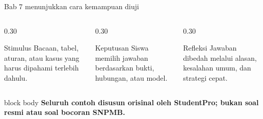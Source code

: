 \begin{frame}{Bab 7 menunjukkan cara kemampuan diuji}
  \begin{columns}[T,onlytextwidth]
    \begin{column}{0.30\textwidth}
      \begin{block}{Stimulus}
        Bacaan, tabel, aturan, atau kasus yang harus dipahami terlebih dahulu.
      \end{block}
    \end{column}
    \begin{column}{0.30\textwidth}
      \begin{block}{Keputusan}
        Siswa memilih jawaban berdasarkan bukti, hubungan, atau model.
      \end{block}
    \end{column}
    \begin{column}{0.30\textwidth}
      \begin{block}{Refleksi}
        Jawaban dibedah melalui alasan, kesalahan umum, dan strategi cepat.
      \end{block}
    \end{column}
  \end{columns}
  \vspace{0.25cm}
  \begin{beamercolorbox}[rounded=true,sep=0.18cm,wd=\textwidth]{block body}
    \centering\bfseries Seluruh contoh disusun orisinal oleh StudentPro; bukan soal resmi atau soal bocoran SNPMB.
  \end{beamercolorbox}
\end{frame}

